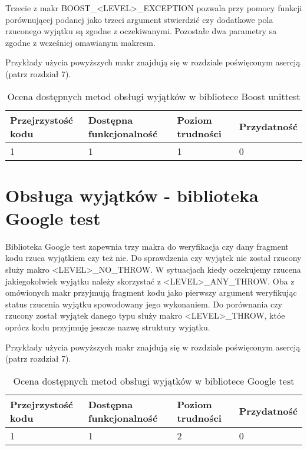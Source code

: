 \documentclass[12pt,a4paper,notitlepage]{report}
\begin{document}
Trzecie z makr BOOST{\_}<LEVEL>{\_}EXCEPTION pozwala przy pomocy funkcji porównującej podanej jako trzeci argument stwierdzić czy dodatkowe pola rzuconego wyjątku są zgodne z oczekiwanymi. Pozostałe dwa parametry sa zgodne z wcześniej omawianym makresm.

Przykłady użycia powyższych makr znajdują się w rozdziale poświęconym asercją (patrz rozdział 7).

\begin{center}
			\begin{table}[!ht]
			\caption{Ocena dostępnych metod obsługi wyjątków w bibliotece Boost unittest}
			\label{}
			\begin{tabular}[!hc]{|l|l|l|l|}
		\hline
		Przejrzystość kodu 	&	Dostępna funkcjonalność	&	Poziom trudności	&	Przydatność \\ \hline
		1					&	1						&	1					& 	0  			\\ \hline
			\end{tabular}
			\end{table} 
		\end{center}

\section{Obsługa wyjątków - biblioteka Google test}
Biblioteka Google test zapewnia trzy makra do weryfikacja czy dany fragment kodu rzuca wyjątkiem czy też nie.
Do sprawdzenia czy wyjątek nie został rzucony służy makro <LEVEL>{\_}NO{\_}THROW.
W sytuacjach kiedy oczekujemy rzucena jakiegokolwiek wyjątku należy skorzystać z <LEVEL>{\_}ANY{\_}THROW. Oba z omówionych makr przyjmują fragment kodu jako pierwszy argument weryfikując status rzucenia wyjątku spowodowany jego wykonaniem.
Do porównania czy rzucony został wyjątek danego typu służy makro <LEVEL>{\_}THROW, któe oprócz kodu przyjmuję jeszcze nazwę struktury wyjątku.

Przykłady użycia powyższych makr znajdują się w rozdziale poświęconym asercją (patrz rozdział 7). 

\begin{center}
			\begin{table}[!ht]
			\caption{Ocena dostępnych metod obsługi wyjątków w bibliotece Google test}
			\label{}
			\begin{tabular}[!hc]{|l|l|l|l|}
		\hline
		Przejrzystość kodu 	&	Dostępna funkcjonalność	&	Poziom trudności	&	Przydatność \\ \hline
		1					&	1						&	2					& 	0  			\\ \hline
			\end{tabular}
			\end{table} 
		\end{center}
\end{document}
